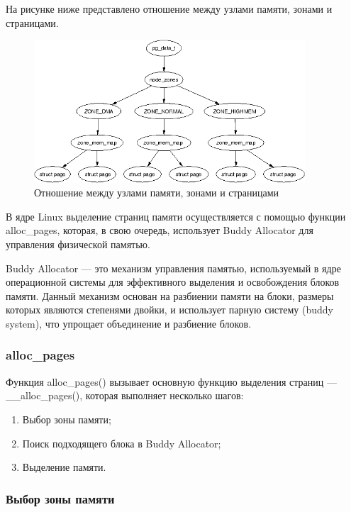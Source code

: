 На рисунке ниже представлено отношение между узлами памяти, зонами и страницами.

\begin{figure}[H]
	\centering
	\includegraphics[width=0.9\textwidth]{img/zones.png}
	\caption{Отношение между узлами памяти, зонами и страницами~\cite{pmem}}
	\label{fig:pmem}
\end{figure}

В ядре Linux выделение страниц памяти осуществляется с помощью функции alloc\_pages, которая, в свою очередь, использует Buddy Allocator для управления физической памятью.

Buddy Allocator --- это механизм управления памятью, используемый в ядре операционной системы для эффективного выделения и освобождения блоков памяти.
Данный механизм основан на разбиении памяти на блоки, размеры которых являются степенями двойки, и использует парную систему (buddy system), что упрощает объединение и разбиение блоков.

\subsubsection*{alloc\_pages}

Функция alloc\_pages() вызывает основную функцию выделения страниц --- \_\_alloc\_pages(), которая выполняет несколько шагов:
\begin{enumerate}
    \item Выбор зоны памяти;
    \item Поиск подходящего блока в Buddy Allocator;
    \item Выделение памяти.
\end{enumerate}

\subsubsection*{Выбор зоны памяти}

